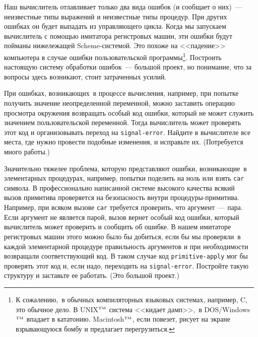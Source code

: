 \begin{exercise}{5.30}%
\label{EX5.30}%
%
%
Наш вычислитель отлавливает только два
вида ошибок (и сообщает о них)~--- неизвестные типы выражений и неизвестные типы
процедур.  При других ошибках он будет выпадать из управляющего
цикла.  Когда мы запускаем вычислитель с помощью имитатора
регистровых машин, эти ошибки будут пойманы нижележащей
Scheme-системой.  Это похоже на <<падение>> компьютера  в
случае ошибки пользовательской программы\footnote{К сожалению,~в обычных компиляторных языковых системах, например,
 C, это обычное
дело. В  UNIX${}^{\mbox{\tiny TM}}$ система 
<<кидает дамп>>,~в 
DOS/Windows${}^{\mbox{\tiny TM}}$ впадает в
кататонию.    Macintosh${}^{\mbox{\tiny TM}}$, если повезет,
рисует на экране взрывающуюся бомбу и предлагает перегрузиться.
}.
Построить настоящую систему обработки ошибок~--- большой проект, но понимание,
что за вопросы здесь возникают, стоит затраченных усилий.


\begin{plainenum}


\item
При ошибках, возникающих~в процессе вычисления,
например, при попытке получить значение неопределенной переменной,
можно заставить операцию просмотра окружения возвращать особый код
ошибки, который не может служить значением пользовательской
переменной. Тогда вычислитель может проверять этот код и
организовывать переход на {\tt signal-error}.  Найдите в
вычислителе все места, где нужно провести подобные изменения, и
исправьте их.   (Потребуется много работы.)

\item
Значительно тяжелее проблема, которую
представляют ошибки, возникающие~в элементарных процедурах, например,
попытки поделить на ноль или взять {\tt car} символа.  В
профессионально написанной системе высокого качества всякий вызов
примитива проверяется на безопасность внутри процедуры-примитива.
Например, при всяком вызове {\tt car} требуется проверить, что
аргумент~--- пара.  Если аргумент не является парой, вызов вернет
особый код ошибки, который вычислитель может проверить и сообщить об
ошибке.  В нашем имитаторе регистровых машин этого можно было бы
добиться, если бы мы проверяли~в каждой элементарной процедуре
правильность аргументов и при необходимости возвращали
соответствующий код.  В таком случае код {\tt primitive-apply}
мог бы проверять этот код и, если надо, переходить на
{\tt signal-error}.   Постройте такую структуру и заставьте ее
работать.  (Это большой проект.)
\end{plainenum}
\end{exercise}

